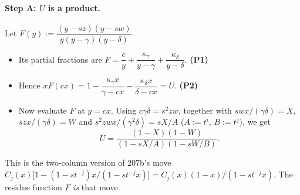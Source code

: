 \documentclass[11pt]{amsart}
\theoremstyle{remark}
\newcommand{\plab}[1]{\textbf{(#1)}}
\begin{document}
\paragraph{Step A: $U$ is a product.} Let $F(y):=\dfrac{(y-sz)(y-sw)}{y(y-\gamma)(y-\delta)}$.
\begin{itemize}
\item Its partial fractions are $F=\dfrac cy+\dfrac{\kappa_\gamma}{y-\gamma}+\dfrac{\kappa_\delta}{y-\delta}$. \hfill\plab{P1}
\item Hence $xF(cx)=1-\dfrac{\kappa_\gamma x}{\gamma-cx}-\dfrac{\kappa_\delta x}{\delta-cx}=U$. \hfill\plab{P2}
\item Now evaluate $F$ at $y=cx$. Using $c\gamma\delta=s^2zw$, together with $swx/(\gamma\delta)=X$, $szx/(\gamma\delta)=W$ and $s^2zwx/(\gamma^2\delta)=sX/A$ ($A:=t^i$, $B:=t^j$), we get
\[
U=\frac{(1-X)(1-W)}{(1-sX/A)(1-sW/B)}.\tag{P3}
\]
\end{itemize}
This is the two-column version of 207b's move $C_j(x)\bigl[1-(1-st^{-j})x/(1-st^{-j}x)\bigr]=C_j(x)(1-x)/(1-st^{-j}x)$. The residue function $F$ \emph{is} that move.
\end{document}

